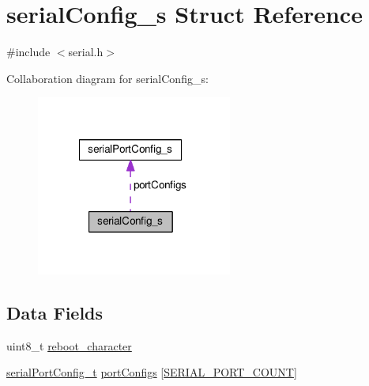 \hypertarget{structserialConfig__s}{\section{serial\+Config\+\_\+s Struct Reference}
\label{structserialConfig__s}
}


{\ttfamily \#include $<$serial.\+h$>$}



Collaboration diagram for serial\+Config\+\_\+s\+:\nopagebreak
\begin{figure}[H]
\begin{center}
\leavevmode
\includegraphics[width=182pt]{structserialConfig__s__coll__graph}
\end{center}
\end{figure}
\subsection*{Data Fields}
\begin{DoxyCompactItemize}
\item 
uint8\+\_\+t \hyperlink{structserialConfig__s_ae339221260676ebdb195ce66defc32ee}{reboot\+\_\+character}
\item 
\hyperlink{config_2serial_8h_a35e022f85e53e709a6d1b3147f40621e}{serial\+Port\+Config\+\_\+t} \hyperlink{structserialConfig__s_ab42c30ae7b86c9954a9301a5aecd759c}{port\+Configs} \mbox{[}\hyperlink{test_2unit_2target_8h_af040928dacfd97611f1283a6246bfce2}{S\+E\+R\+I\+A\+L\+\_\+\+P\+O\+R\+T\+\_\+\+C\+O\+U\+N\+T}\mbox{]}
\end{DoxyCompactItemize}


